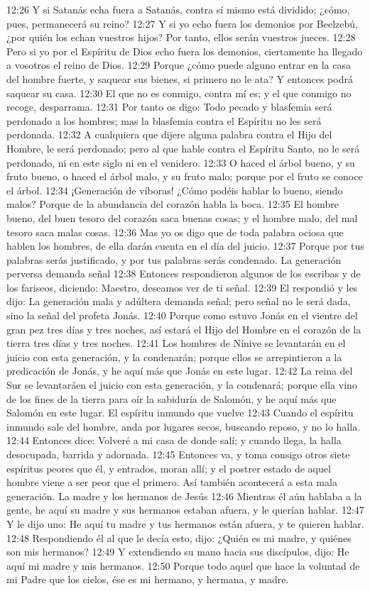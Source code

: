 12:26 Y si Satanás echa fuera a Satanás, contra sí mismo está dividido; ¿cómo, pues, permanecerá su reino? 
12:27 Y si yo echo fuera los demonios por Beelzebú, ¿por quién los echan vuestros hijos? Por tanto, ellos serán vuestros jueces. 
12:28 Pero si yo por el Espíritu de Dios echo fuera los demonios, ciertamente ha llegado a vosotros el reino de Dios. 
12:29 Porque ¿cómo puede alguno entrar en la casa del hombre fuerte, y saquear sus bienes, si primero no le ata? Y entonces podrá saquear su casa. 
12:30 El que no es conmigo, contra mí es; y el que conmigo no recoge, desparrama. 
12:31 Por tanto os digo: Todo pecado y blasfemia será perdonado a los hombres; mas la blasfemia contra el Espíritu no les será perdonada. 
12:32 A cualquiera que dijere alguna palabra contra el Hijo del Hombre, le será perdonado; pero al que hable contra el Espíritu Santo, no le será perdonado, ni en este siglo ni en el venidero. 
12:33 O haced el árbol bueno, y su fruto bueno, o haced el árbol malo, y su fruto malo; porque por el fruto se conoce el árbol. 
12:34 ¡Generación de víboras! ¿Cómo podéis hablar lo bueno, siendo malos? Porque de la abundancia del corazón habla la boca. 
12:35 El hombre bueno, del buen tesoro del corazón saca buenas cosas; y el hombre malo, del mal tesoro saca malas cosas. 
12:36 Mas yo os digo que de toda palabra ociosa que hablen los hombres, de ella darán cuenta en el día del juicio. 
12:37 Porque por tus palabras serás justificado, y por tus palabras serás condenado. 
La generación perversa demanda señal  
12:38 Entonces respondieron algunos de los escribas y de los fariseos, diciendo: Maestro, deseamos ver de ti señal. 
12:39 El respondió y les dijo: La generación mala y adúltera demanda señal; pero señal no le será dada, sino la señal del profeta Jonás. 
12:40 Porque como estuvo Jonás en el vientre del gran pez tres días y tres noches, así estará el Hijo del Hombre en el corazón de la tierra tres días y tres noches. 
12:41 Los hombres de Nínive se levantarán en el juicio con esta generación, y la condenarán; porque ellos se arrepintieron a la predicación de Jonás, y he aquí más que Jonás en este lugar. 
12:42 La reina del Sur se levantaráen el juicio con esta generación, y la condenará; porque ella vino de los fines de la tierra para oír la sabiduría de Salomón, y he aquí más que Salomón en este lugar. 
El espíritu inmundo que vuelve  
12:43 Cuando el espíritu inmundo sale del hombre, anda por lugares secos, buscando reposo, y no lo halla. 
12:44 Entonces dice: Volveré a mi casa de donde salí; y cuando llega, la halla desocupada, barrida y adornada. 
12:45 Entonces va, y toma consigo otros siete espíritus peores que él, y entrados, moran allí; y el postrer estado de aquel hombre viene a ser peor que el primero. Así también acontecerá a esta mala generación. 
La madre y los hermanos de Jesús  
12:46 Mientras él aún hablaba a la gente, he aquí su madre y sus hermanos estaban afuera, y le 
querían hablar. 
12:47 Y le dijo uno: He aquí tu madre y tus hermanos están afuera, y te quieren hablar. 
12:48 Respondiendo él al que le decía esto, dijo: ¿Quién es mi madre, y quiénes son mis hermanos? 
12:49 Y extendiendo su mano hacia sus discípulos, dijo: He aquí mi madre y mis hermanos. 
12:50 Porque todo aquel que hace la voluntad de mi Padre que los cielos, ése es mi hermano, y hermana, y madre. 

